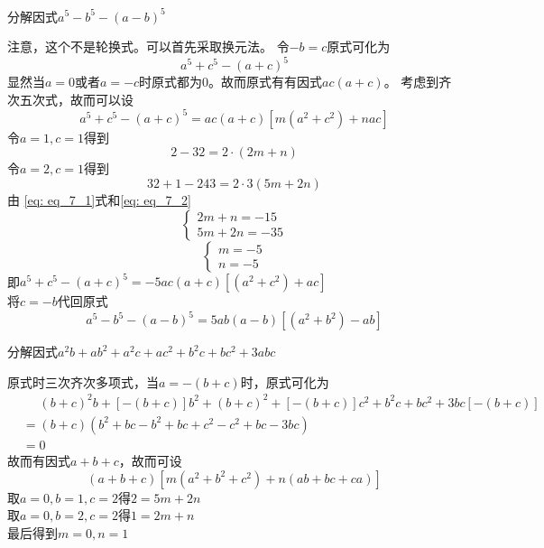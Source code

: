 \documentclass[windows,csize4]{BHCexam}
\begin{document}
\begin{groups}
\begin{questions}[]
        \question[5] 分解因式$a^5-b^5-(a-b)^5$
        \begin{solution}{0.5cm}
            注意，这个不是轮换式。可以首先采取换元法。
            \methodonly 令$-b=c$原式可化为
            \[
                a^5+c^5-(a+c)^5
            \]
            显然当$a=0$或者$a=-c$时原式都为$0$。故而原式有有因式$ac(a+c)$。
            考虑到齐次五次式，故而可以设
            \[
                a^5+c^5-(a+c)^5=ac(a+c)[m(a^2+c^2)+nac]
            \]
            令$a=1,c=1$得到
            \begin{equation}
                \label{eq: eq_7_1}
                2-32=2\cdot (2m+n)
            \end{equation}
            令$a=2,c=1$得到
            \begin{equation}
                \label{eq: eq_7_2}
                32+1-243=2\cdot 3(5m+2n)
            \end{equation}  
            由 \ref{eq: eq_7_1}式和\ref{eq: eq_7_2}         
            \begin{equation}
                \begin{cases}
                    2m+n=-15 \\
                    5m+2n=-35
                \end{cases}
            \end{equation}
            \begin{equation}
                \begin{cases}
                    m=-5 \\
                    n=-5
                \end{cases}
            \end{equation}
            即$a^5+c^5-(a+c)^5=-5ac(a+c)[(a^2+c^2)+ac]$ \\
            将$c=-b$代回原式
            \[
                a^5-b^5-(a-b)^5=5ab(a-b)[(a^2+b^2)-ab]
            \]
        \end{solution}
        \vspace{3.5cm}

        \question[5] 分解因式$a^2b+ab^2+a^2c+ac^2+b^2c+bc^2+3abc$
        \begin{solution}{0.5cm}
            \method 原式时三次齐次多项式，当$a=-(b+c)$时，原式可化为
            \[
                \begin{aligned}
                    & \phantom{=} (b+c)^2b+[-(b+c)]b^2+(b+c)^2+[-(b+c)]c^2+b^2c+bc^2+3bc[-(b+c)] \\
                    &= (b+c)(b^2+bc-b^2+bc+c^2-c^2+bc-3bc) \\
                    &=0
                \end{aligned}
            \]
            故而有因式$a+b+c$，故而可设
            \[
                (a+b+c)[m(a^2+b^2+c^2)+n(ab+bc+ca)]  
            \]
            取$a=0,b=1,c=2$得$2=5m+2n$ \\ 
            取$a=0,b=2,c=2$得$1=2m+n$ \\
            最后得到$m=0,n=1$


\end{solution}
\end{questions}
\end{groups}
\end{document}
